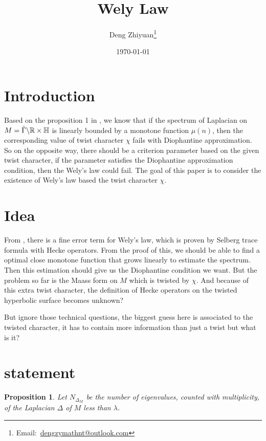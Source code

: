 \documentclass[12pt,a4paper,english]{article}
\title{Wely Law}
\date{\today}
\author{Deng Zhiyuan\footnote{Email:\ \href{mailto:dengzymathnt@outlook.com}{dengzymathnt@outlook.com}}}
\theoremstyle{plain}
\newtheorem{prop}[thm]{Proposition}
\theoremstyle{definition}
\theoremstyle{remark}
\begin{document}
\maketitle
\newpage

\tableofcontents
\newpage

\section{Introduction}
Based on the proposition 1 in \cite{hoffmann1991cuspidal}, we know that if the spectrum of Laplacian on $M=\Tilde{\Gamma}\backslash\mathbb{R}\times\mathbb{H}$ is linearly bounded by a monotone function $\mu(n)$, then the corresponding value of twist character $\chi$ fails with Diophantine approximation.  So on the opposite way, there should be a criterion parameter based on the given twist character, if the parameter satisfies the Diophantine approximation condition, then the Wely's law could fail. The goal of this paper is to consider the existence of Wely's law based the twist character $\chi$.

\section{Idea}

From \cite{finis2021remainder}, there is a fine error term for Wely's law, which is proven by Selberg trace formula with Hecke operators. From the proof of this, we should be able to find a optimal close monotone function that grows linearly to estimate the spectrum. Then this estimation should give us the Diophantine condition we want. But the problem so far is the Maass form on $M$ which is twisted by $\chi$. And because of this extra twist character, the definition of Hecke operators on the twisted hyperbolic surface becomes unknown?

But ignore those technical questions, the biggest guess here is associated to the twisted character, it has to contain more information than just a twist but what is it?

\section{statement}
\begin{prop}
Let $N_{\Delta_{M}}$ be the number of eigenvalues, counted with multiplicity, of the Laplacian $\Delta$ of $M$ less than $\lambda$.   
\end{prop}
\newpage


\end{document}

